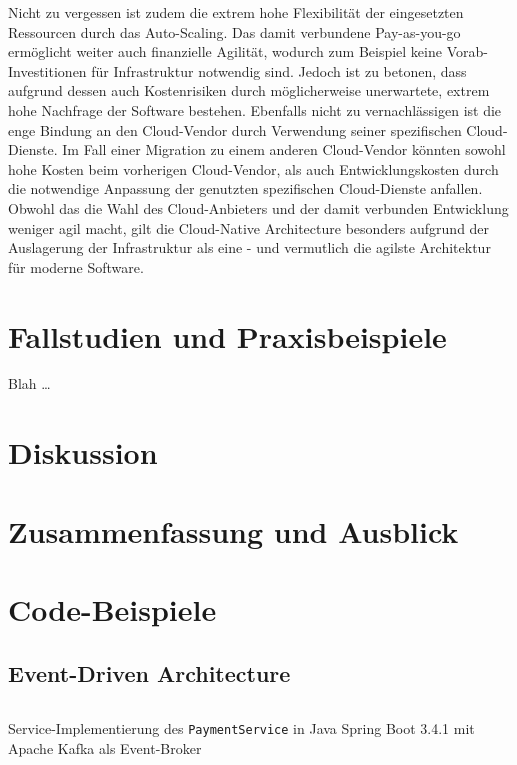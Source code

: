 \documentclass[acmtog]{acmart}
\begin{document}
Nicht zu vergessen ist zudem die extrem hohe Flexibilität der eingesetzten Ressourcen durch das Auto-Scaling.
Das damit verbundene Pay-as-you-go ermöglicht weiter auch finanzielle Agilität, wodurch zum Beispiel keine Vorab-Investitionen für Infrastruktur notwendig sind.
Jedoch ist zu betonen, dass aufgrund dessen auch Kostenrisiken durch möglicherweise unerwartete, extrem hohe Nachfrage der Software bestehen.
Ebenfalls nicht zu vernachlässigen ist die enge Bindung an den Cloud-Vendor durch Verwendung seiner spezifischen Cloud-Dienste.
Im Fall einer Migration zu einem anderen Cloud-Vendor könnten sowohl hohe Kosten beim vorherigen Cloud-Vendor, als auch Entwicklungskosten durch die notwendige
Anpassung der genutzten spezifischen Cloud-Dienste anfallen.
Obwohl das die Wahl des Cloud-Anbieters und der damit verbunden Entwicklung weniger agil macht, gilt die Cloud-Native Architecture besonders aufgrund der Auslagerung
der Infrastruktur als eine - und vermutlich die agilste Architektur für moderne Software.

\section{Fallstudien und Praxisbeispiele}
Blah \ldots

\section{Diskussion}

\section{Zusammenfassung und Ausblick}









\appendix

\section{Code-Beispiele}

\subsection{Event-Driven Architecture}
\label{app:code:eda:paymentservice}
\begin{listing}[H]
  \tiny
  \inputminted[linenos=true]{java}{code/eda/PaymentService.java}
  \caption{Service-Implementierung des \texttt{PaymentService} in Java Spring Boot 3.4.1 mit Apache Kafka als Event-Broker}
\end{listing}
\end{document}
